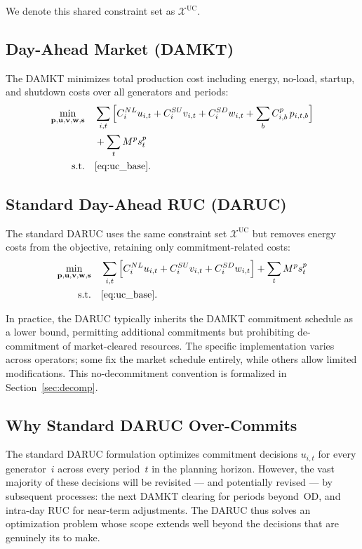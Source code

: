 \documentclass[journal]{IEEEtran}
\begin{document}
We denote this shared constraint set as $\mathcal{X}^{\text{UC}}$.

\subsection{Day-Ahead Market (DAMKT)}

The DAMKT minimizes total production cost including energy,
no-load, startup, and shutdown costs over all generators and periods:
\begin{align}\label{eq:damkt_obj}
\min_{\mathbf{p},\mathbf{u},\mathbf{v},\mathbf{w},\mathbf{s}}
\quad &\sum_{i,t} \Big[
  C_i^{NL} u_{i,t} + C_i^{SU} v_{i,t} + C_i^{SD} w_{i,t}
  + \sum_b C_{i,b}^p\, p_{i,t,b}
\Big] \nonumber\\
&+ \sum_t M^p s_t^p \\
\text{s.t.} \quad
& \eqref{eq:uc_base}. \nonumber
\end{align}

\subsection{Standard Day-Ahead RUC (DARUC)}

The standard DARUC uses the same constraint set
$\mathcal{X}^{\text{UC}}$ but removes energy costs from the
objective, retaining only commitment-related costs:
\begin{align}\label{eq:daruc_obj}
\min_{\mathbf{p},\mathbf{u},\mathbf{v},\mathbf{w},\mathbf{s}}
\quad &\sum_{i,t} \Big[
  C_i^{NL} u_{i,t} + C_i^{SU} v_{i,t} + C_i^{SD} w_{i,t}
\Big]
+ \sum_t M^p s_t^p \\
\text{s.t.} \quad
& \eqref{eq:uc_base}. \nonumber
\end{align}

In practice, the DARUC typically inherits the DAMKT commitment
schedule as a lower bound, permitting additional commitments but
prohibiting de-commitment of market-cleared resources.
The specific implementation varies across operators; some fix the
market schedule entirely, while others allow limited modifications.
This no-decommitment convention is formalized in
Section~\ref{sec:decomp}.

\subsection{Why Standard DARUC Over-Commits}\label{sec:overcommit}

The standard DARUC formulation optimizes commitment decisions
$u_{i,t}$ for every generator~$i$ across every period~$t$ in the
planning horizon.
However, the vast majority of these decisions will be revisited ---
and potentially revised --- by subsequent processes: the next DAMKT
clearing for periods beyond~OD, and intra-day RUC for near-term
adjustments.
The DARUC thus solves an optimization problem whose scope extends
well beyond the decisions that are genuinely its to make.
\end{document}
